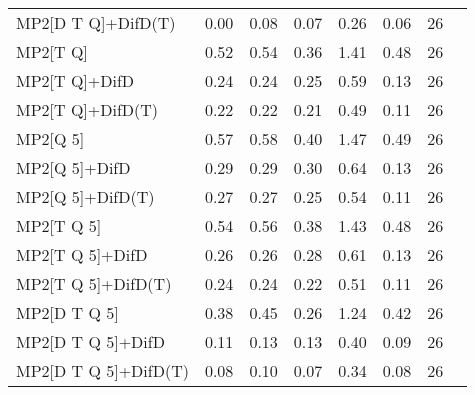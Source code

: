 \begin{table}
\begin{tabular}{l l l l l l l l }
    MP2[D T Q]+DifD(T) & 0.00 & 0.08 & 0.07 & 0.26 & 0.06 & 26 \\ 
    MP2[T Q] & 0.52 & 0.54 & 0.36 & 1.41 & 0.48 & 26 \\ 
    MP2[T Q]+DifD & 0.24 & 0.24 & 0.25 & 0.59 & 0.13 & 26 \\ 
    MP2[T Q]+DifD(T) & 0.22 & 0.22 & 0.21 & 0.49 & 0.11 & 26 \\ 
    MP2[Q 5] & 0.57 & 0.58 & 0.40 & 1.47 & 0.49 & 26 \\ 
    MP2[Q 5]+DifD & 0.29 & 0.29 & 0.30 & 0.64 & 0.13 & 26 \\ 
    MP2[Q 5]+DifD(T) & 0.27 & 0.27 & 0.25 & 0.54 & 0.11 & 26 \\ 
    MP2[T Q 5] & 0.54 & 0.56 & 0.38 & 1.43 & 0.48 & 26 \\ 
    MP2[T Q 5]+DifD & 0.26 & 0.26 & 0.28 & 0.61 & 0.13 & 26 \\ 
    MP2[T Q 5]+DifD(T) & 0.24 & 0.24 & 0.22 & 0.51 & 0.11 & 26 \\ 
    MP2[D T Q 5] & 0.38 & 0.45 & 0.26 & 1.24 & 0.42 & 26 \\ 
    MP2[D T Q 5]+DifD & 0.11 & 0.13 & 0.13 & 0.40 & 0.09 & 26 \\ 
    MP2[D T Q 5]+DifD(T) & 0.08 & 0.10 & 0.07 & 0.34 & 0.08 & 26 \\ 
    \bottomrule
  \end{tabular}
\end{table}
